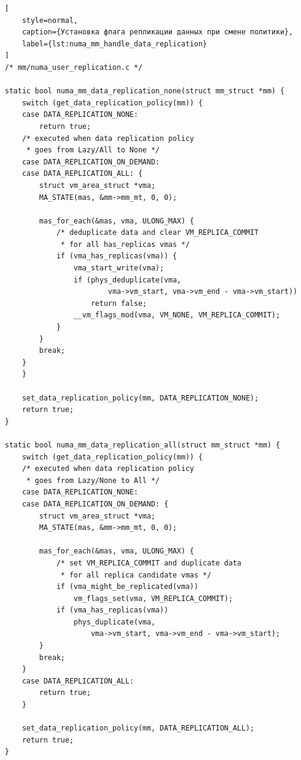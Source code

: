 \begin{lstlisting}[
    style=normal,
    caption={Установка флага репликации данных при смене политики},
    label={lst:numa_mm_handle_data_replication}
]
/* mm/numa_user_replication.c */

static bool numa_mm_data_replication_none(struct mm_struct *mm) {
	switch (get_data_replication_policy(mm)) {
	case DATA_REPLICATION_NONE:
		return true;
    /* executed when data replication policy
     * goes from Lazy/All to None */
	case DATA_REPLICATION_ON_DEMAND:
	case DATA_REPLICATION_ALL: {
		struct vm_area_struct *vma;
		MA_STATE(mas, &mm->mm_mt, 0, 0);

		mas_for_each(&mas, vma, ULONG_MAX) {
            /* deduplicate data and clear VM_REPLICA_COMMIT
             * for all has_replicas vmas */
			if (vma_has_replicas(vma)) {
				vma_start_write(vma);
				if (phys_deduplicate(vma,
						vma->vm_start, vma->vm_end - vma->vm_start))
					return false;
				__vm_flags_mod(vma, VM_NONE, VM_REPLICA_COMMIT);
			}
		}
		break;
	}
	}

	set_data_replication_policy(mm, DATA_REPLICATION_NONE);
	return true;
}

static bool numa_mm_data_replication_all(struct mm_struct *mm) {
	switch (get_data_replication_policy(mm)) {
    /* executed when data replication policy
     * goes from Lazy/None to All */
	case DATA_REPLICATION_NONE:
	case DATA_REPLICATION_ON_DEMAND: {
		struct vm_area_struct *vma;
		MA_STATE(mas, &mm->mm_mt, 0, 0);

		mas_for_each(&mas, vma, ULONG_MAX) {
            /* set VM_REPLICA_COMMIT and duplicate data
             * for all replica candidate vmas */
			if (vma_might_be_replicated(vma))
				vm_flags_set(vma, VM_REPLICA_COMMIT);
			if (vma_has_replicas(vma))
				phys_duplicate(vma,
                    vma->vm_start, vma->vm_end - vma->vm_start);
		}
		break;
	}
	case DATA_REPLICATION_ALL:
		return true;
	}

	set_data_replication_policy(mm, DATA_REPLICATION_ALL);
	return true;
}
\end{lstlisting}
\vspace{0.5cm}


